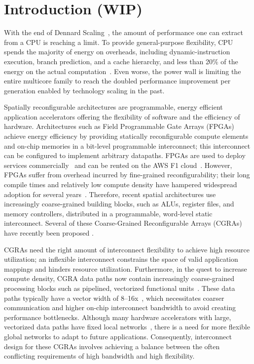 \chapter{Introduction (WIP)}

With the end of Dennard Scaling~\cite{dennard}, the amount of performance one can extract from a CPU is reaching a limit.
To provide general-purpose flexibility, CPU spends the majority of energy on overheads, including dynamic-instruction execution, branch prediction, and a cache hierarchy, and less than 20\% of the energy on the actual computation~\cite{mark}.
Even worse, the power wall is limiting the entire multicore family
to reach the doubled performance improvement per generation enabled by technology scaling in the past\cite{multicorescale}.

Spatially reconfigurable architectures are programmable, energy efficient application accelerators offering the flexibility of software and the efficiency of hardware.
Architectures such as Field Programmable Gate Arrays (FPGAs) achieve energy efficiency by providing statically reconfigurable compute elements and on-chip memories in a bit-level programmable interconnect; this interconnect can be configured to implement arbitrary datapaths. FPGAs are used to deploy services commercially~\cite{microsoft, baidu, deephi}
and can be rented on the AWS F1 cloud~\cite{aws}. However, FPGAs suffer from overhead incurred by fine-grained reconfigurability; their long compile times
and relatively low compute density have hampered widespread adoption for several years~\cite{bolsens, calhoun, fpgaPower, fpgaSurvey}. 
Therefore, recent spatial architectures use
increasingly coarse-grained building blocks, such as ALUs, register files, and memory controllers, distributed in a programmable, word-level static interconnect.
Several of these Coarse-Grained Reconfigurable Arrays (CGRAs) have recently been proposed \cite{adres, kress, dyser, piperench, tartan, hrl, ti, hycube, plasticine}.

CGRAs need the right amount of interconnect flexibility to achieve high resource utilization; an inflexible interconnect constrains the space of
valid application mappings and hinders resource utilization. Furthermore, in the quest to increase compute density, CGRA data paths now 
contain increasingly coarse-grained processing blocks such as pipelined, vectorized functional units~\cite{plasticine, piperench, xilinx-acap}.
These data paths typically have a vector width of 8--16x~\cite{plasticine}, which necessitates coarser communication and higher on-chip interconnect bandwidth to avoid
creating performance bottlenecks. 
Although many hardware accelerators with large, vectorized data paths have fixed local networks~\cite{brainwave}, there is a need for more
flexible global networks to adapt to future applications.
Consequently, interconnect design for these CGRAs involves achieving a balance between the often conflicting requirements of high bandwidth and high flexibility.
